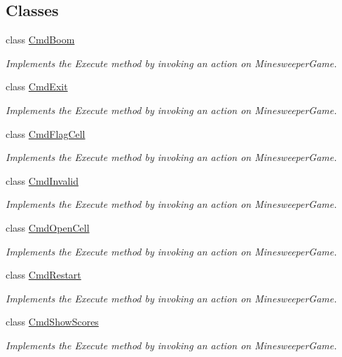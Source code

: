 \subsection*{Classes}
\begin{DoxyCompactItemize}
\item 
class \hyperlink{class_minesweeper_1_1_cmd_boom}{Cmd\+Boom}
\begin{DoxyCompactList}\small\item\em Implements the Execute method by invoking an action on Minesweeper\+Game. \end{DoxyCompactList}\item 
class \hyperlink{class_minesweeper_1_1_cmd_exit}{Cmd\+Exit}
\begin{DoxyCompactList}\small\item\em Implements the Execute method by invoking an action on Minesweeper\+Game. \end{DoxyCompactList}\item 
class \hyperlink{class_minesweeper_1_1_cmd_flag_cell}{Cmd\+Flag\+Cell}
\begin{DoxyCompactList}\small\item\em Implements the Execute method by invoking an action on Minesweeper\+Game. \end{DoxyCompactList}\item 
class \hyperlink{class_minesweeper_1_1_cmd_invalid}{Cmd\+Invalid}
\begin{DoxyCompactList}\small\item\em Implements the Execute method by invoking an action on Minesweeper\+Game. \end{DoxyCompactList}\item 
class \hyperlink{class_minesweeper_1_1_cmd_open_cell}{Cmd\+Open\+Cell}
\begin{DoxyCompactList}\small\item\em Implements the Execute method by invoking an action on Minesweeper\+Game. \end{DoxyCompactList}\item 
class \hyperlink{class_minesweeper_1_1_cmd_restart}{Cmd\+Restart}
\begin{DoxyCompactList}\small\item\em Implements the Execute method by invoking an action on Minesweeper\+Game. \end{DoxyCompactList}\item 
class \hyperlink{class_minesweeper_1_1_cmd_show_scores}{Cmd\+Show\+Scores}
\begin{DoxyCompactList}\small\item\em Implements the Execute method by invoking an action on Minesweeper\+Game. \end{DoxyCompactList}\end{DoxyCompactItemize}
